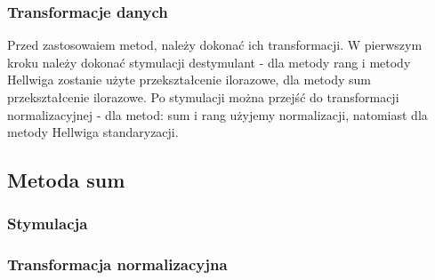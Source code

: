 \documentclass[12pt,a4paper]{report}
\begin{document}
{\begin{Shaded}
\begin{Highlighting}[]
\NormalTok{dane_porzadkowanie<-zbior_danych[}\NormalTok{(}\NormalTok{,}\NormalTok{,}\NormalTok{,}
                                   \NormalTok{,}
                                   \NormalTok{,}\NormalTok{)]}
\end{Highlighting}
\end{Shaded}

\subsubsection{Transformacje danych}\label{transformacje-danych}

Przed zastosowaiem metod, należy dokonać ich transformacji. W pierwszym
kroku należy dokonać stymulacji destymulant - dla metody rang i metody
Hellwiga zostanie użyte przekształcenie ilorazowe, dla metody sum
przekształcenie ilorazowe. Po stymulacji można przejść do transformacji
normalizacyjnej - dla metod: sum i rang użyjemy normalizacji,
natomiast dla metody Hellwiga standaryzacji.


\subsection{Metoda sum}
\subsubsection{Stymulacja} 
\begin{Shaded}
\begin{Highlighting}[]
\NormalTok{)} 
\end{Highlighting}
\end{Shaded}

\subsubsection{Transformacja normalizacyjna}
\begin{Shaded}
\begin{Highlighting}[]
\end{Highlighting}
\end{Shaded}

}
\end{document}
